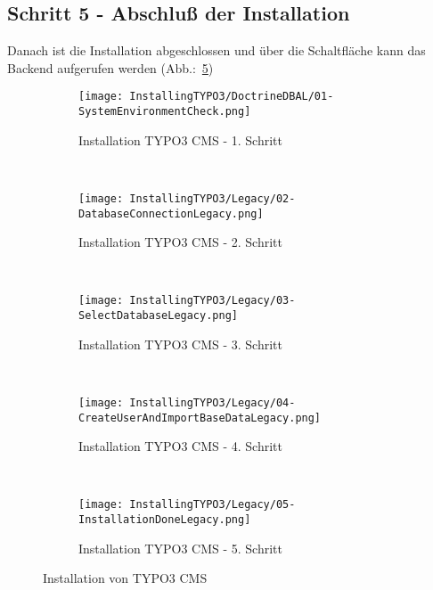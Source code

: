 	\subsection{Schritt 5 - Abschluß der Installation}
	Danach ist die Installation abgeschlossen und über die Schaltfläche kann das Backend aufgerufen werden (Abb.:~\ref{fig:installTYPO3LegacyStepFive})

	\begin{figure}[H]
		\begin{subfigure}[b]{0.5\textwidth}
			\texttt{[image: InstallingTYPO3/DoctrineDBAL/01-SystemEnvironmentCheck.png]}
			\caption{Installation TYPO3 CMS - 1. Schritt}
			\label{fig:installTYPO3LegacyStepOne}
		\end{subfigure}%
		~ %
		\begin{subfigure}[b]{0.5\textwidth}
			\texttt{[image: InstallingTYPO3/Legacy/02-DatabaseConnectionLegacy.png]}
			\caption{Installation TYPO3 CMS - 2. Schritt}
			\label{fig:installTYPO3LegacyStepTwo}
		\end{subfigure}
		~ %
		\begin{subfigure}[b]{0.5\textwidth}
			\texttt{[image: InstallingTYPO3/Legacy/03-SelectDatabaseLegacy.png]}
			\caption{Installation TYPO3 CMS - 3. Schritt}
			\label{fig:installTYPO3LegacyStepThree}
		\end{subfigure}%
		~ %
		\begin{subfigure}[b]{0.5\textwidth}
			\texttt{[image: InstallingTYPO3/Legacy/04-CreateUserAndImportBaseDataLegacy.png]}
			\caption{Installation TYPO3 CMS - 4. Schritt}
			\label{fig:installTYPO3LegacyStepFour}
		\end{subfigure}
		~ %
		\begin{subfigure}[b]{0.5\textwidth}
			\texttt{[image: InstallingTYPO3/Legacy/05-InstallationDoneLegacy.png]}
			\caption{Installation TYPO3 CMS - 5. Schritt}
			\label{fig:installTYPO3LegacyStepFive}
		\end{subfigure}%
		\caption{Installation von TYPO3 CMS}
		\label{fig:installationOfTYPO3}
	\end{figure}
